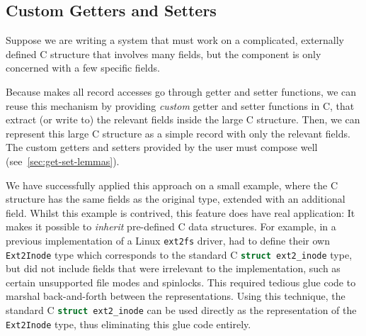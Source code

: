 \subsection{Custom Getters and Setters}\label{ssec:partial-rec}

Suppose we are writing a \cogent system that must work on a complicated, externally defined C structure that involves many fields, but the \cogent component is only concerned with a few specific fields. 

Because \dargent makes all record accesses go through getter and setter functions, we can reuse this mechanism by providing \emph{custom} getter and setter functions in C, that extract (or write to) the relevant fields inside the large C structure.  Then, we can represent this large C structure as a simple \cogent record with only the relevant fields.
The custom getters and setters provided by the user must compose well (see~\autoref{sec:get-set-lemmas}).

We have successfully applied this approach on a small example, where the
C structure has the same fields as the original \cogent type, extended
with an additional field. Whilst this example is contrived, this feature
does have real application: It makes it possible to \emph{inherit}
pre-defined C data structures. For example, in a previous \cogent implementation of a Linux \texttt{ext2fs} driver, \citet{Amani:2016}
had to define their own \Cogent \verb!Ext2Inode! type which corresponds to the standard C \lstinline[language=C]!struct ext2_inode! type, but did not include fields that were irrelevant to the \cogent implementation, such as  certain unsupported file modes and spinlocks. This required tedious glue code to marshal back-and-forth between the representations. 
Using this technique, the standard C \lstinline[language=C]!struct ext2_inode! can be used directly as the representation of the \verb!Ext2Inode! type, thus eliminating this glue code entirely.


